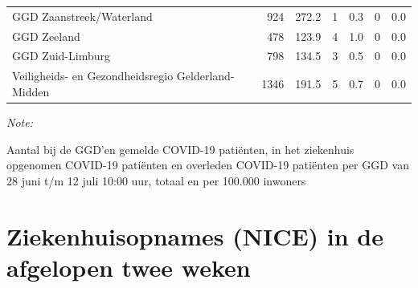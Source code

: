 \documentclass[
  english,
  man,floatsintext]{apa6}
\begin{document}
\begin{table}
\begin{threeparttable}
\begin{tabular}{lrrrrrr}
GGD Zaanstreek/Waterland & 924 & 272.2 & 1 & 0.3 & 0 & 0.0\\
GGD Zeeland & 478 & 123.9 & 4 & 1.0 & 0 & 0.0\\
GGD Zuid-Limburg & 798 & 134.5 & 3 & 0.5 & 0 & 0.0\\
Veiligheids- en Gezondheidsregio Gelderland-Midden & 1346 & 191.5 & 5 & 0.7 & 0 & 0.0\\
\bottomrule
\end{tabular}
\begin{tablenotes}
\item \textit{Note: } 
\item Aantal bij de GGD’en gemelde COVID-19 patiënten, in het ziekenhuis opgenomen COVID-19 patiënten en overleden COVID-19 patiënten per GGD van 28 juni t/m 12 juli 10:00 uur, totaal en per 100.000 inwoners
\end{tablenotes}
\end{threeparttable}
\endgroup{}
\end{table}

\newpage

\hypertarget{ziekenhuisopnames-nice-in-de-afgelopen-twee-weken}{%
\section{Ziekenhuisopnames (NICE) in de afgelopen twee weken}\label{ziekenhuisopnames-nice-in-de-afgelopen-twee-weken}}
\end{document}
